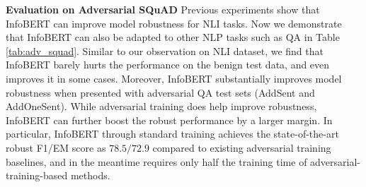 \documentclass{article} \usepackage{iclr2021_conference,times}
\theoremstyle{definition}
\theoremstyle{remark}
\newcommand{\method}{InfoBERT\xspace}
\begin{document}
\textbf{Evaluation on Adversarial SQuAD} Previous experiments show that \method can improve model robustness for NLI tasks. Now we demonstrate that \method can also be adapted to other NLP tasks such as QA in Table \ref{tab:adv_squad}. Similar to our observation on NLI dataset, we find that \method barely hurts the performance on the benign test data, and even improves it in some cases. Moreover, \method substantially improves model robustness when presented with adversarial QA test sets (AddSent and AddOneSent). While adversarial training does help improve robustness, \method can further boost the robust performance by a larger margin. In particular, \method through standard training achieves the state-of-the-art robust F1/EM score as $78.5/72.9$ compared to existing adversarial training baselines, and in the meantime requires only half the training time of adversarial-training-based methods. 
\end{document}
